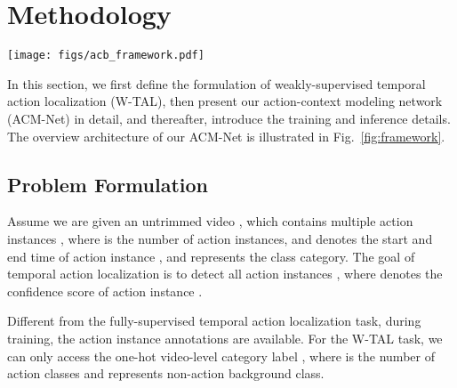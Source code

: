 \documentclass[journal,comsoc]{IEEEtran}
\begin{document}
\section{Methodology}
\begin{figure*}[ht]
    \centering
    \texttt{[image: figs/acb\_framework.pdf]}
    \caption{The framework of our proposed ACM-Net, which consists of three parts, i.e. pre-trained feature extraction, video feature embedding, and weakly-supervised temporal action localization guided by action context modeling. We first apply the pre-trained model to extract video snippets level spatial and temporal features, and then employ the feature embedding module to map the pre-trained feature to task-specific feature space. Therefore, to suppress the ambiguous action context frames, we propose a three-branch attention module and multiply the obtained attention values by the raw class activation sequences CAS to obtain the weighted CAS of the corresponding branch, and then employ a multi-instance learning mechanism to learn and model action instance features under supervision with only video-level labels.
    }
    \label{fig:framework}
\end{figure*}

\par In this section, we first define the formulation of weakly-supervised temporal action localization (W-TAL), then present our action-context modeling network (ACM-Net) in detail, and thereafter, introduce the training and inference details. The overview architecture of our ACM-Net is illustrated in Fig.~\ref{fig:framework}.

\subsection{Problem Formulation}
\label{sec:problem_formulation}
\par Assume we are given an untrimmed video , which contains multiple action instances , where  is the number of action instances,  and  denotes the start and end time of action instance , and  represents the class category. The goal of temporal action localization is to detect all action instances , where  denotes the confidence score of action instance .
\par Different from the fully-supervised temporal action localization task, during training, the action instance annotations are available. For the W-TAL task, we can only access the one-hot video-level category label , where  is the number of action classes and  represents non-action background class.
\end{document}
